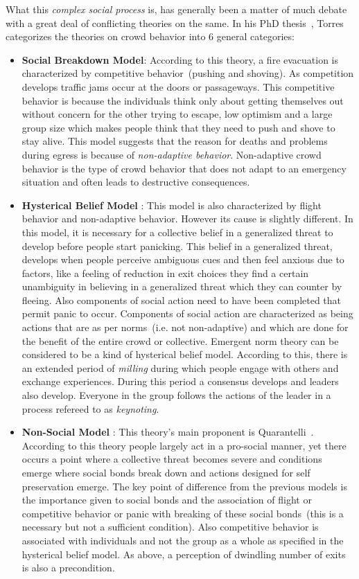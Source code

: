 What this \emph{complex social process} is, has generally been a matter of much debate with a great deal of conflicting theories on the same. In his PhD thesis~\cite{Torres:2010tj}, Torres categorizes the theories on crowd behavior into 6 general categories:
\begin{itemize}
\item {\bf Social Breakdown Model}: According to this theory, a fire evacuation is characterized by competitive behavior~(pushing and shoving). As competition develops traffic jams occur at the doors or passageways. This competitive behavior is because the individuals think only about getting themselves out without concern for the other trying to escape, low optimism and a large group size which makes people think that they need to push and shove to stay alive. This model suggests that the reason for deaths and problems during egress is because of \emph{non-adaptive behavior}. Non-adaptive crowd behavior is the type of crowd behavior that does not adapt to an emergency situation and often leads to destructive consequences.

\item {\bf Hysterical Belief Model }: This model is also characterized by flight behavior and non-adaptive behavior. However its cause is slightly different. In this model, it is necessary for a collective belief in a generalized threat to develop before people start panicking. This belief in a generalized threat, develops when people perceive ambiguous cues and then feel anxious due to factors, like a feeling of reduction in exit choices they find a certain unambiguity in believing in a generalized threat which they can counter by fleeing. Also components of social action need to have been completed that permit panic to occur. Components of social action are characterized as being actions that are as per norms~(i.e. not non-adaptive) and which are done for the benefit of the entire crowd or collective. Emergent norm theory can be considered to be a kind of hysterical belief model. According to this, there is an extended period of \emph{milling} during which people engage with others and exchange experiences. During this period a consensus develops and leaders also develop. Everyone in the group follows the actions of the leader in a process refereed to as \emph{keynoting}.

\item {\bf Non-Social Model }: This theory's main proponent is Quarantelli~\cite{Quarantelli:1954vr}. According to this theory people largely act in a pro-social manner, yet there occurs a point where a collective threat becomes severe and conditions emerge where social bonds break down and actions designed for self preservation emerge. The key point of difference from the previous models is the importance given to social bonds and the association of flight or competitive behavior or panic with breaking of these social bonds~(this is a necessary but not a sufficient condition). Also competitive behavior is associated with individuals and not the group as a whole as specified in the hysterical belief model. As above, a perception of dwindling number of exits is also a precondition.


\end{itemize}
